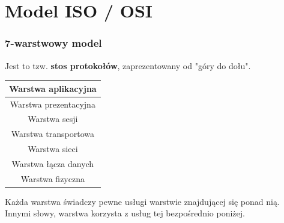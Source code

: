 \documentclass[a4paper,twoside]{article}
\begin{document}
\part{Model ISO / OSI}
\section{7-warstwowy model}
Jest to tzw. \textbf{stos protokołów}, zaprezentowany od "góry do dołu".
\begin{table}[h]
	\begin{tabular}{|c|}
		\hline
		Warstwa aplikacyjna	\\ \hline
		Warstwa prezentacyjna	\\ \hline
		Warstwa sesji		\\ \hline
		Warstwa transportowa		\\ \hline
		Warstwa sieci	\\ \hline
		Warstwa łącza danych		\\ \hline
		Warstwa fizyczna \\ \hline
	\end{tabular}
\end{table}
Każda warstwa świadczy pewne usługi warstwie znajdującej się ponad nią. Innymi słowy, warstwa korzysta z usług tej bezpośrednio poniżej.
\end{document}
